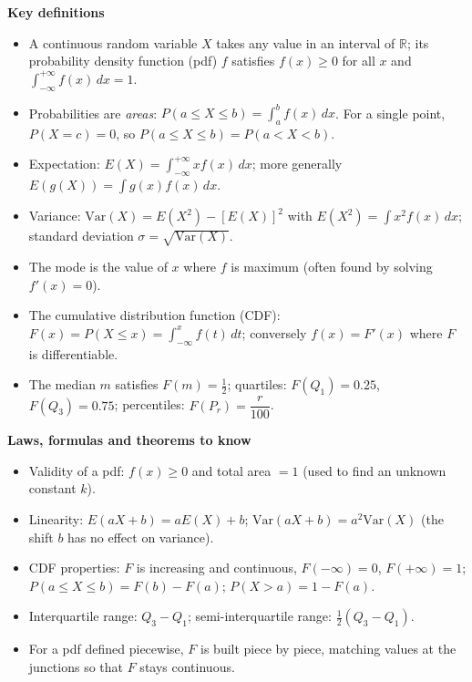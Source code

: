 \documentclass[11pt]{article}
\newcommand{\cle}[1]{{\popxbold\color{popdark}#1}}
\begin{document}
\begin{bilan}
\textbf{Key definitions}\par
\begin{itemize}
\item A \cle{continuous random variable} $X$ takes any value in an interval of $\mathbb{R}$; its \cle{probability density function} (pdf) $f$ satisfies $f(x)\ge 0$ for all $x$ and $\displaystyle\int_{-\infty}^{+\infty} f(x)\,dx = 1$.
\item Probabilities are \emph{areas}: $P(a\le X\le b)=\displaystyle\int_a^b f(x)\,dx$. For a single point, $P(X=c)=0$, so $P(a\le X\le b)=P(a<X<b)$.
\item \cle{Expectation}: $E(X)=\displaystyle\int_{-\infty}^{+\infty} x f(x)\,dx$; more generally $E(g(X))=\displaystyle\int g(x)f(x)\,dx$.
\item \cle{Variance}: $\mathrm{Var}(X)=E(X^2)-[E(X)]^2$ with $E(X^2)=\displaystyle\int x^2 f(x)\,dx$; standard deviation $\sigma=\sqrt{\mathrm{Var}(X)}$.
\item The \cle{mode} is the value of $x$ where $f$ is maximum (often found by solving $f'(x)=0$).
\item The \cle{cumulative distribution function} (CDF): $F(x)=P(X\le x)=\displaystyle\int_{-\infty}^{x} f(t)\,dt$; conversely $f(x)=F'(x)$ where $F$ is differentiable.
\item The \cle{median} $m$ satisfies $F(m)=\tfrac12$; quartiles: $F(Q_1)=0.25$, $F(Q_3)=0.75$; percentiles: $F(P_r)=\dfrac{r}{100}$.
\end{itemize}

\textbf{Laws, formulas and theorems to know}\par
\begin{itemize}
\item Validity of a pdf: $f(x)\ge 0$ and total area $=1$ (used to find an unknown constant $k$).
\item Linearity: $E(aX+b)=aE(X)+b$; $\mathrm{Var}(aX+b)=a^2\mathrm{Var}(X)$ (the shift $b$ has no effect on variance).
\item CDF properties: $F$ is increasing and continuous, $F(-\infty)=0$, $F(+\infty)=1$; $P(a\le X\le b)=F(b)-F(a)$; $P(X>a)=1-F(a)$.
\item Interquartile range: $Q_3-Q_1$; semi-interquartile range: $\tfrac12(Q_3-Q_1)$.
\item For a pdf defined piecewise, $F$ is built piece by piece, matching values at the junctions so that $F$ stays continuous.
\end{itemize}


\end{bilan}
\end{document}
